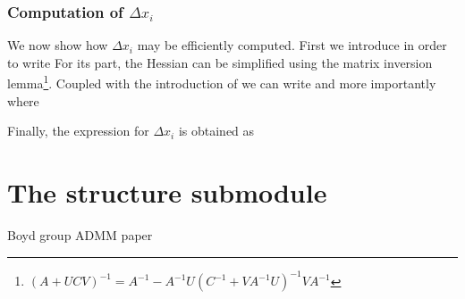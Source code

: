 \documentclass{book}
\begin{document}
\subsubsection{Computation of $\Delta x_i$}
We now show how $\Delta x_i$ may be efficiently computed.
First we introduce
    in order to write
For its part, the Hessian can be simplified using the matrix inversion lemma\footnote{$(A + UCV)^{-1} = A^{-1} - A^{-1}U (C^{-1} + V A^{-1} U)^{-1} V A^{-1}$}.
Coupled with the introduction of 
    we can write
    and more importantly
    where
 
Finally, the expression for $\Delta x_i$ is obtained as
        
    
\section{The structure submodule}


\begin{thebibliography}{99}
 Boyd group ADMM paper
\end{thebibliography}
\end{document}
